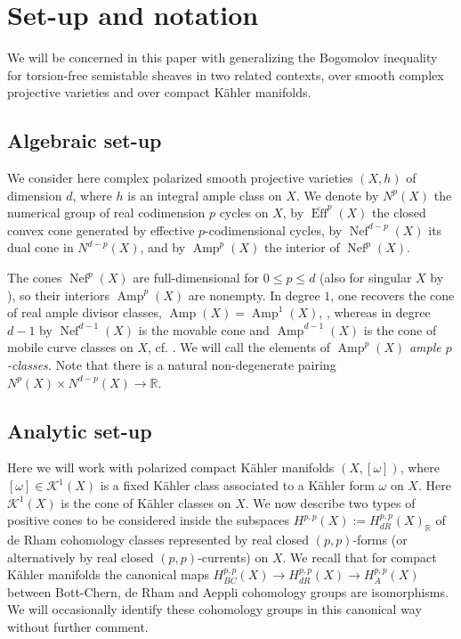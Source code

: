 \documentclass[a4,reqno]{amsart}
\theoremstyle{definition}
\def\cK{\mathcal K}
\newcommand{\R}{\mathbb{R}}
\DeclareMathOperator{\Amp}{Amp}
\DeclareMathOperator{\Eff}{Eff}
\DeclareMathOperator{\Nef}{Nef}
\numberwithin{equation}{section}
\begin{document}
\section{Set-up and notation}\label{sec:setup}
We will be concerned in this paper with generalizing the Bogomolov inequality for torsion-free semistable sheaves in two related contexts, over smooth complex projective varieties and over compact K\"ahler manifolds. %

\subsection{Algebraic set-up} We consider here complex polarized smooth projective varieties $(X,h)$ of dimension $d$, where $h$ is an integral ample class on $X$. We denote by  $N^p(X)$ the numerical group of real codimension $p$ cycles on $X$, by  $\overline{\Eff}^p(X)$ the closed convex cone generated by effective $p$-codimensional cycles, by $\Nef^{d-p}(X)$ its dual cone in $N^{d-p}(X)$,   and by $\Amp^{p}(X)$ the interior of $\Nef^p(X)$. 


 The cones $\Nef^p(X)$ are full-dimensional for $0\le p\le d$ (also for singular $X$ by \cite[Lemma 3.7]{FulgerLehmann2017cones}), so their interiors $\Amp^{p}(X)$ are nonempty. %
 In degree $1$, one recovers the cone of real ample divisor classes, $\Amp(X)=\Amp^1(X)$, \cite{Kleiman}, whereas in degree $d-1$ by \cite{bdpp} $\Nef^{d-1}(X)$ is the movable cone and $\Amp^{d-1}(X)$ is the cone of mobile curve classes on $X$, cf. \cite[Definition 11.4.16]{Lazbook2}. 
We will call the elements of $\Amp^{p}(X)$ {\em ample $p$-classes.} %
Note that there is a natural non-degenerate pairing $N^p(X)\times N^{d-p}(X)\to\R$.

\subsection{Analytic set-up} 

Here we will work with polarized compact K\"ahler manifolds $(X,[\omega])$, where $[\omega]\in \cK^1(X)$ is a fixed K\"ahler class associated to a K\"ahler form $\omega$ on $X$. Here $\cK^1(X)$ is the cone of K\"ahler classes on $X$. We now describe two types of positive cones to be considered inside the subspaces $H^{p,p}(X):=H^{p,p}_{dR}(X)_\R$ of de Rham cohomology classes represented by real closed $(p,p)$-forms (or alternatively by real closed $(p,p)$-currents) on $X$. We recall that for compact K\"ahler manifolds the canonical maps $H^{p,p}_{BC}(X)\to H^{p,p}_{dR}(X)\to H^{p,p}_A(X)$ between Bott-Chern, de Rham and Aeppli cohomology groups are isomorphisms. We will occasionally identify these cohomology groups in this canonical way without further comment. 
\end{document}
